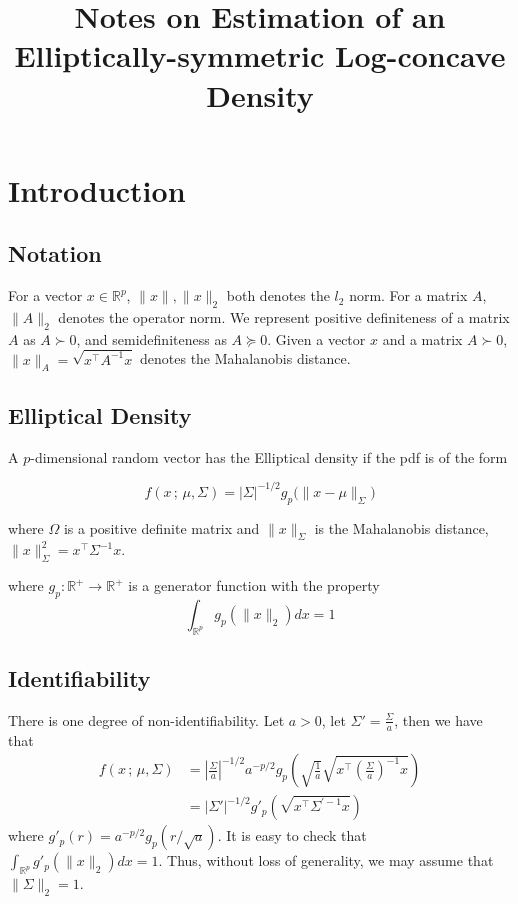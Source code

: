 \documentclass[12pt]{article}
\title{Notes on Estimation of an Elliptically-symmetric Log-concave Density}
\begin{document}
\maketitle
\tableofcontents
\newpage


\section{Introduction}



\subsection{Notation}

For a vector $x \in \mathbb{R}^p$, $\| x \|, \|x \|_2$ both denotes the $l_2$ norm. For a matrix $A$, $\| A \|_2$ denotes the operator norm. We represent positive definiteness of a matrix $A$ as $A \succ 0$, and semidefiniteness as $A \succeq 0$. Given a vector $x$ and a matrix $A \succ 0$, $\| x \|_A = \sqrt{ x^\top A^{-1} x }$ denotes the Mahalanobis distance.

\subsection{Elliptical Density}

A $p$-dimensional random vector has the Elliptical density if the pdf is of the form

\[
f(x \,;\, \mu, \Sigma) = | \Sigma |^{- 1/2} g_p \big( \| x - \mu \|_{\Sigma}  \big)
\]

where $\Omega$ is a positive definite matrix and $\| x \|_{\Sigma}$ is the Mahalanobis distance, $\| x \|^2_{\Sigma} = x^\top \Sigma^{-1} x$. 

where $g_p : \mathbb{R}^+ \rightarrow \mathbb{R}^+$ is a generator function with the property
\[
\int_{\mathbb{R}^p} g_p( \| x \|_2 ) dx = 1
\]

\subsection{Identifiability}
There is one degree of non-identifiability. Let $a > 0$, let $\Sigma' = \frac{\Sigma}{a}$, then we have that
\begin{align*}
 f(x \,;\, \mu, \Sigma) &= \left| \frac{\Sigma}{a} \right|^{-1/2} a^{-p/2} g_p\left(
         \sqrt{\frac{1}{a} } \sqrt{x^\top \left( \frac{\Sigma}{a} \right)^{-1} x } \right) \\
   &= | \Sigma' |^{-1/2} g'_p( \sqrt{ x^\top \Sigma^{\prime -1} x } ) 
\end{align*}
where $g'_p(r) = a^{-p/2} g_p( r/\sqrt{a} )$. It is easy to check that $\int_{\mathbb{R}^p} g'_p( \| x \|_2 ) dx = 1$. Thus, without loss of generality, we may assume that $\| \Sigma \|_2 = 1$.
\end{document}
